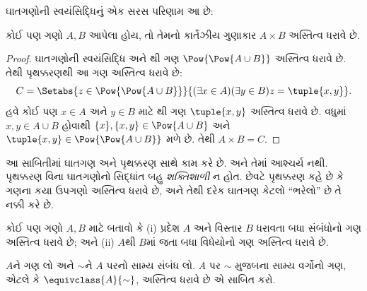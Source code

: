 ઘાતગણોની સ્વયંસિદ્ધિનું એક સરસ પરિણામ આ છે:

\begin{prop}\label{thm:Products}
કોઈ પણ ગણો $A, B$ આપેલા હોય, તો તેમનો કાર્તેઝીય ગુણાકાર
$A \times B$ અસ્તિત્વ ધરાવે છે.
\end{prop}

\begin{proof}
ઘાતગણોની સ્વયંસિદ્ધિ અને
થી ગણ
$\Pow{\Pow{A \cup B}}$ અસ્તિત્વ ધરાવે છે. તેથી પૃથક્કરણથી
આ ગણ અસ્તિત્વ ધરાવે છે:
\[
C = \Setabs{z \in \Pow{\Pow{A \cup B}}}{(\exists x \in A)(\exists y \in B) z = \tuple{x, y}}.
\]
હવે કોઈ પણ $x \in A$ અને $y \in B$ માટે
થી ગણ
$\tuple{x, y}$ અસ્તિત્વ ધરાવે છે. વધુમાં $x, y
\in A \cup B$ હોવાથી $\{x\}, \{x, y\} \in \Pow{A \cup B}$
અને $\tuple{x,y} \in \Pow{\Pow{A \cup B}}$ મળે છે.
તેથી $A \times B = C$.
\end{proof}

આ સાબિતીમાં ઘાતગણ અને પૃથક્કરણ સાથે કામ કરે છે. અને તેમાં
આશ્ચર્ય નથી. પૃથક્કરણ વિના ઘાતગણોનો સિદ્ધાંત બહુ
\emph{શક્તિશાળી} ન હોત. છેવટે પૃથક્કરણ કહે છે કે ગણના કયા
ઉપગણો અસ્તિત્વ ધરાવે છે, અને તેથી દરેક ઘાતગણ કેટલો ``ભરેલો''
છે તે નક્કી કરે છે.

\begin{prob}
કોઈ પણ ગણો $A, B$ માટે બતાવો કે (i) પ્રદેશ $A$ અને વિસ્તાર
$B$ ધરાવતા બધા સંબંધોનો ગણ અસ્તિત્વ ધરાવે છે; અને
(ii) $A$થી $B$માં જતા બધા વિધેયોનો ગણ અસ્તિત્વ ધરાવે છે.
\end{prob}

\begin{prob}
$A$ને ગણ લો અને $\sim$ને $A$ પરનો સામ્ય સંબંધ લો.
$A$ પર $\sim$ મુજબના સામ્ય વર્ગોનો ગણ, એટલે કે
$\equivclass{A}{\sim}$, અસ્તિત્વ ધરાવે છે એ સાબિત કરો.
\end{prob}
\endgroup

\begingroup
\makeatletter{}\makeatother

\label{guunit:OLP-0543}


